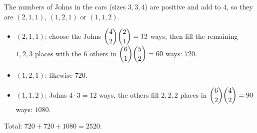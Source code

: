 The numbers of Johns in the cars (sizes $3,3,4$) are positive and add to $4$, so they are $(2,1,1)$, $(1,2,1)$ or $(1,1,2)$.
\begin{itemize}
\item $(2,1,1)$: choose the Johns $\dbinom42\dbinom21=12$ ways, then fill the remaining $1,2,3$ places with the $6$ others in $\dbinom61\dbinom52=60$ ways: $720$.
\item $(1,2,1)$: likewise $720$.
\item $(1,1,2)$: Johns $4\cdot3=12$ ways, the others fill $2,2,2$ places in $\dbinom62\dbinom42=90$ ways: $1080$.
\end{itemize}
Total: $720+720+1080=\boxed{2520}$.

